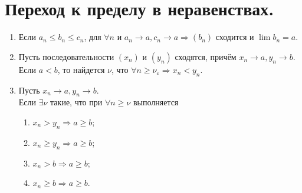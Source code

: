 \section{Переход к пределу в неравенствах.}
\begin{lem}
	\begin{enumerate}
		\item Если $a_n\leqslant b_n \leqslant c_n$, для $\forall n $ и $a_n \to a, c_n \to a \Rightarrow (b_n)$ сходится и $\lim b_n = a$.
		\item  Пусть последовательности $(x_n)$ и $(y_n)$ сходятся, причём $x_n \to a, y_n \to b$. Если $a<b$, то найдется $\nu$, что $\forall n \geqslant \nu_\varepsilon \Rightarrow x_n < y_n$.
		\item Пусть $x_n \to a, y_n \to b$.\\
		Если $\exists\nu$ такие, что при $\forall n \geqslant\nu$ выполняется\begin{enumerate}
			\item $x_n>y_n\Rightarrow a \geqslant b$;
			\item $x_n \geqslant y_n\Rightarrow a \geqslant b$;
			\item $x_n>b\Rightarrow a \geqslant b$;
			\item $x_n\geqslant b \Rightarrow a \geqslant b$.
		\end{enumerate}
	\end{enumerate}
\end{lem}


